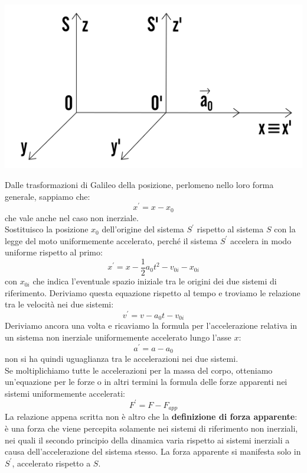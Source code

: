 \documentclass[a4paper,12pt, oneside]{book}
\begin{document}
\begin{center}
	\includegraphics[scale=0.5]{img/gal2.png}
\end{center}
Dalle trasformazioni di Galileo della posizione, perlomeno nello loro forma generale, sappiamo che:
$$x^{'}=x-x_0$$
che vale anche nel caso non inerziale.\\
Sostituisco la posizione $x_0$ dell'origine del sistema $S^{'}$ rispetto al sistema $S$  con la legge del moto uniformemente accelerato, perché il sistema $S^{'}$ accelera in modo uniforme rispetto al primo:
$$x^{'}=x-\frac{1}{2}a_0t^2-v_{0i}-x_{0i}$$
con $x_{0i}$ che indica l'eventuale spazio iniziale tra le origini dei due sistemi di riferimento. Deriviamo questa equazione rispetto al tempo e troviamo le relazione tra le velocità nei due sistemi:
$$v^{'}=v-a_0t-v_{0i}$$
Deriviamo ancora una volta e ricaviamo la formula per l'accelerazione relativa in un sistema non inerziale uniformemente accelerato lungo l'asse $x$:
$$a^{'}=a-a_0$$
non si ha quindi uguaglianza tra le accelerazioni nei due sistemi.
\\Se moltiplichiamo tutte le accelerazioni per la massa del corpo, otteniamo un'equazione per le forze o in altri termini la formula delle forze apparenti nei sistemi uniformemente accelerati:
$$F^{'}=F-F_{app}$$
La relazione appena scritta non è altro che la \textbf{definizione di forza apparente}: è una forza che viene percepita solamente nei sistemi di riferimento non inerziali, nei quali il secondo principio della dinamica varia rispetto ai sistemi inerziali a causa dell'accelerazione del sistema stesso. La forza apparente si manifesta solo in $S^{'}$, accelerato rispetto a $S$.
\end{document}
